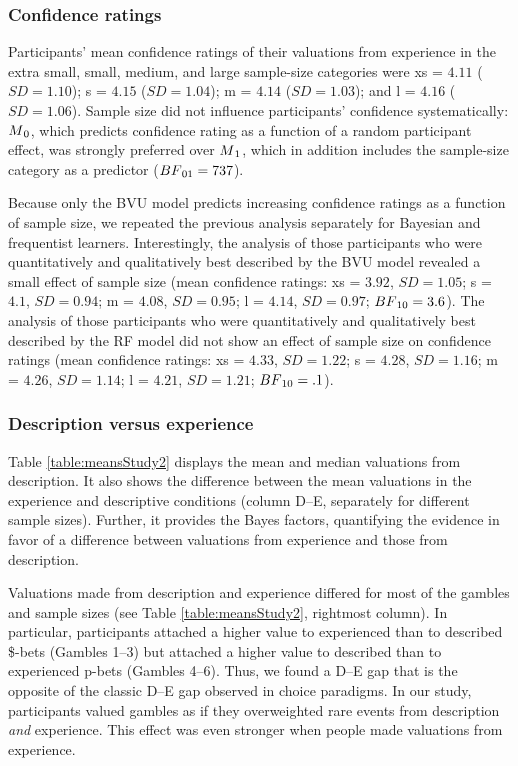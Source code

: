 \documentclass[a4paper,man, natbib]{apa6} %
\begin{document}
\subsubsection{Confidence ratings}
Participants' mean confidence ratings of their valuations from experience in the extra small, small, medium, and large sample-size categories were xs = $4.11$ ($SD = 1.10$); s = $4.15$ ($SD = 1.04$); m = $4.14$ ($SD = 1.03$); and l = $4.16$ ($SD = 1.06$). Sample size did not influence participants' confidence systematically: $M\textsubscript{0}$, which predicts confidence rating as a function of a random participant effect, was strongly preferred over $M\textsubscript{1}$, which in addition includes the sample-size category as a predictor ($BF\textsubscript{01} = 737$).

Because only the BVU model predicts increasing confidence ratings as a function of sample size, we repeated the previous analysis separately for Bayesian and frequentist learners. Interestingly, the analysis of those participants who were quantitatively and qualitatively best described by the BVU model revealed a small effect of sample size (mean confidence ratings: xs = $3.92$, $SD = 1.05$; s = $4.1$, $SD = 0.94$; m = $4.08$, $SD = 0.95$; l = $4.14$, $SD = 0.97$; $BF\textsubscript{10} = 3.6$). The analysis of those participants who were quantitatively and qualitatively best described by the RF model did not show an effect of sample size on confidence ratings (mean confidence ratings: xs = $4.33$, $SD = 1.22$; s = $4.28$, $SD = 1.16$; m = $4.26$, $SD = 1.14$; l = $4.21$, $SD = 1.21$; $BF\textsubscript{10} = .1$).



\subsubsection{Description versus experience}
Table \ref{table:meansStudy2} displays the mean and median valuations from description. It also shows the difference between the mean valuations in the experience and descriptive conditions (column D--E, separately for different sample sizes). Further, it provides the Bayes factors, quantifying the evidence in favor of a difference between valuations from experience and those from description.


Valuations made from description and experience differed for most of the gambles and sample sizes (see Table \ref{table:meansStudy2}, rightmost column). In particular, participants attached a higher value to experienced than to described \$-bets (Gambles 1--3) but attached a higher value to described than to experienced p-bets (Gambles 4--6). Thus, we found a D--E gap that is the opposite of the classic D--E gap observed in choice paradigms. In our study, participants valued gambles as if they overweighted rare events from description \textit{and} experience. This effect was even stronger when people made valuations from experience.
\end{document}
